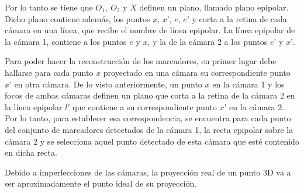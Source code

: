 Por lo tanto se tiene que \(O_1,~O_2\) y \(X\) definen un plano, llamado plano epipolar. Dicho plano contiene además, los puntos \(x\), \(x’\), \(e\), \(e’\) y corta a la retina de cada cámara en una línea, que recibe el nombre de línea epipolar. La línea epipolar de la cámara 1, contiene a los puntos \(e\) y \(x\), y la de la cámara 2 a los puntos \(e’\) y \(x’\).
	
Para poder hacer la reconstrucción de los marcadores, en primer lugar debe hallarse para cada punto \(x\) proyectado en una cámara su correspondiente punto \(x’\) en otra cámara. De lo visto anteriormente, un punto \(x\) en la cámara 1 y los focos de ambas cámaras definen un plano que corta a la retina de la cámara 2 en la línea epipolar \(l'\) que contiene a su correspondiente punto \(x’\) en la cámara 2. Por lo tanto, para establecer esa correspondencia, se encuentra para cada punto del conjunto de marcadores detectados de la cámara 1, la recta epipolar sobre la cámara 2 y se selecciona aquel punto detectado de esta cámara que esté contenido en dicha recta.

Debido a imperfecciones de las cámaras, la proyección real de un punto 3D va a ser aproximadamente el punto ideal de su proyección. 

